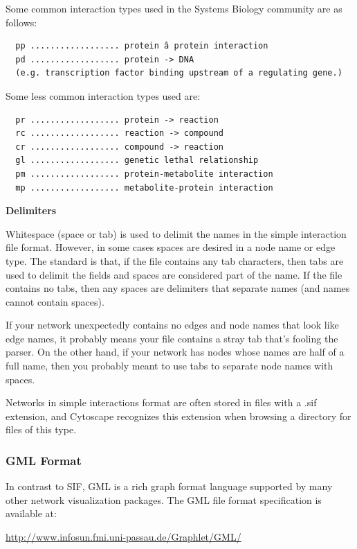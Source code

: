  Some common interaction types used in the Systems Biology community are as follows: 
\begin{verbatim}
  pp .................. protein â protein interaction
  pd .................. protein -> DNA   
  (e.g. transcription factor binding upstream of a regulating gene.)

\end{verbatim}


 Some less common interaction types used are: 
\begin{verbatim}
  pr .................. protein -> reaction
  rc .................. reaction -> compound
  cr .................. compound -> reaction
  gl .................. genetic lethal relationship
  pm .................. protein-metabolite interaction
  mp .................. metabolite-protein interaction

\end{verbatim}


 \textbf{Delimiters}


 Whitespace (space or tab) is used to delimit the names in the simple interaction file format. However, in some cases spaces are desired in a node name or edge type. The standard is that, if the file contains any tab characters, then tabs are used to delimit the fields and spaces are considered part of the name. If the file contains no tabs, then any spaces are delimiters that separate names (and names cannot contain spaces). 


 If your network unexpectedly contains no edges and node names that look like edge names, it probably means your file contains a stray tab that's fooling the parser. On the other hand, if your network has nodes whose names are half of a full name, then you probably meant to use tabs to separate node names with spaces. 


 Networks in simple interactions format are often stored in files with a .sif extension, and Cytoscape recognizes this extension when browsing a directory for files of this type. 


 

\subsubsection*{GML Format}


 In contrast to SIF, GML is a rich graph format language supported by many other network visualization packages. The GML file format specification is available at: 


 \url{http://www.infosun.fmi.uni-passau.de/Graphlet/GML/}


